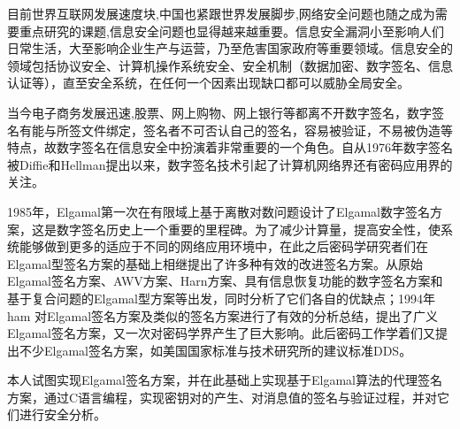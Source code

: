 目前世界互联网发展速度块,中国也紧跟世界发展脚步,网络安全问题也随之成为需要重点研究的课题,信息安全问题也显得越来越重要。信息安全漏洞小至影响人们日常生活，大至影响企业生产与运营，乃至危害国家政府等重要领域。信息安全的领域包括协议安全、计算机操作系统安全、安全机制（数据加密、数字签名、信息认证等），直至安全系统，在任何一个因素出现缺口都可以威胁全局安全。

当今电子商务发展迅速,股票、网上购物、网上银行等都离不开数字签名，数字签名有能与所签文件绑定，签名者不可否认自己的签名，容易被验证，不易被伪造等特点，故数字签名在信息安全中扮演着非常重要的一个角色。自从1976年数字签名被Diffie和Hellman提出以来，数字签名技术引起了计算机网络界还有密码应用界的关注。

1985年，Elgamal第一次在有限域上基于离散对数问题设计了Elgamal数字签名方案，这是数字签名历史上一个重要的里程碑。为了减少计算量，提高安全性，使系统能够做到更多的适应于不同的网络应用环境中，在此之后密码学研究者们在Elgamal型签名方案的基础上相继提出了许多种有效的改进签名方案。从原始Elgamal签名方案、AWV方案、Harn方案、具有信息恢复功能的数字签名方案和基于复合问题的Elgamal型方案等出发，同时分析了它们各自的优缺点；1994年ham 对Elgamal签名方案及类似的签名方案进行了有效的分析总结，提出了广义Elgamal签名方案，又一次对密码学界产生了巨大影响。此后密码工作学着们又提出不少Elgamal签名方案，如美国国家标准与技术研究所的建议标准DDS。

本人试图实现Elgamal签名方案，并在此基础上实现基于Elgamal算法的代理签名方案，通过C语言编程，实现密钥对的产生、对消息值的签名与验证过程，并对它们进行安全分析。
